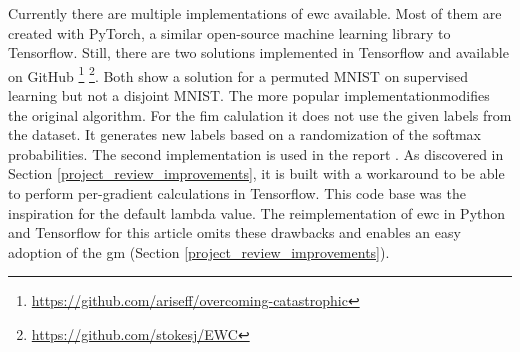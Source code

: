 Currently there are multiple implementations of \acrshort{ewc} available.
Most of them are created with PyTorch, a similar open-source machine learning library to Tensorflow.
Still, there are two solutions implemented in Tensorflow and available on GitHub
\footnote[1]{\url{https://github.com/ariseff/overcoming-catastrophic}}
\footnote[2]{\url{https://github.com/stokesj/EWC}}.
Both show a solution for a permuted MNIST on supervised learning but not a disjoint MNIST.
\newline
The more popular implementation\footnotemark[1] modifies the original algorithm.
For the \acrshort{fim} calulation it does not use the given labels from the dataset.
It generates new labels based on a randomization of the softmax probabilities.
\newline
The second implementation \footnotemark[2] is used in the report \cite{cf_application_oriented_study}.
As discovered in Section \ref{project_review_improvements}, it is built with a workaround to be able to perform per-gradient calculations in Tensorflow.
This code base was the inspiration for the default lambda value.
\newline
The reimplementation of \acrshort{ewc} in Python and Tensorflow for this article omits these drawbacks and enables an easy adoption of the \acrlong{gm} (Section \ref{project_review_improvements}).

